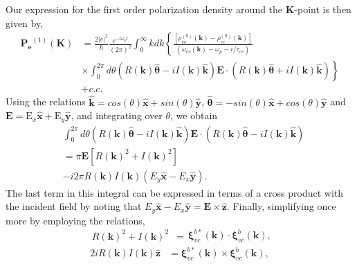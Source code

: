 \documentclass[twocolumn,secnumarabic,amssymb, nobibnotes, aps, prd, superscriptaddress]{revtex4-1}
\begin{document}
Our expression for the first order polarization density around the $\mathbf{K}$-point is then given by,
\begin{equation}
\begin{aligned}\mathbf{P_{e}}^{(1)}(\mathbf{K}) & =\frac{2|e|^{2}}{\hbar}\frac{e^{-i\omega_{p}t}}{(2\pi)^{2}}\int_{0}^{\infty}kdk\left\{ \frac{\left[\rho_{vv}^{\left(0\right)}\left(\mathbf{k}\right)-\rho_{cc}^{(0)}(\mathbf{k})\right]}{\left(\omega_{cv}(\mathbf{k})-\omega_{p}-i/\tau_{cv}\right)}\right.\\
 & \times\left.\int_{0}^{2\pi}d\theta\left(R(\mathbf{k})\hat{\mathbf{\theta}}-iI(\mathbf{k})\hat{\mathbf{k}}\right)\mathbf{E}\cdot\left(R(\mathbf{k})\hat{\mathbf{\theta}}+iI(\mathbf{k})\hat{\mathbf{k}}\right)\right\}\\ 
& +c.c.
\end{aligned}\label{eq:polar2}
\end{equation}
Using the relations $\hat{\mathbf{k}}=cos(\theta)\hat{\mathbf{x}}+sin(\theta)\hat{\mathbf{y}}$, $\hat{\mathbf{\theta}}=-sin(\theta)\hat{\mathbf{x}}+cos(\theta)\hat{\mathbf{y}}$ and $\mathbf{E}=\textrm{E}_x\hat{\mathbf{x}}+\textrm{E}_y\hat{\mathbf{y}}$, and integrating over $\theta$, we obtain
\begin{equation}
\begin{aligned} & \int_{0}^{2\pi}d\theta\left(R(\mathbf{k})\hat{\mathbf{\theta}}-iI(\mathbf{k})\hat{\mathbf{k}}\right)\mathbf{E}\cdot\left(R(\mathbf{k})\hat{\mathbf{\theta}}-iI(\mathbf{k})\hat{\mathbf{k}}\right)\\
 & =\pi\mathbf{E}\left[R(\mathbf{k})^{2}+I(\mathbf{k})^{2}\right]\\
 & -i2\pi R(\mathbf{k})I(\mathbf{k})\left(E_{y}\hat{\mathbf{x}}-E_{x}\hat{\mathbf{y}}\right).
\end{aligned}
\end{equation}
The last term in this integral can be expressed in terms of a cross product with the incident field by noting that $E_{y}\hat{\mathbf{x}}-E_{x}\hat{\mathbf{y}}=\mathbf{E}\times\hat{\mathbf{z}}$. Finally, simplifying once more by employing the relations,
\begin{equation}
\begin{aligned}R(\mathbf{k})^{2}+I(\mathbf{k})^{2} & =\end{aligned}
\mathbf{\xi}_{vc}^{b*}(\mathbf{k})\cdot\mathbf{\xi}_{vc}^{b}(\mathbf{k}),
\end{equation}
\begin{equation}
\begin{aligned}2iR(\mathbf{k})I(\mathbf{k})\hat{\mathbf{z}} & =\mathbf{\xi}_{vc}^{b*}(\mathbf{k})\times\mathbf{\xi}_{vc}^{b}(\mathbf{k}),\end{aligned}
\end{equation}
\end{document}
